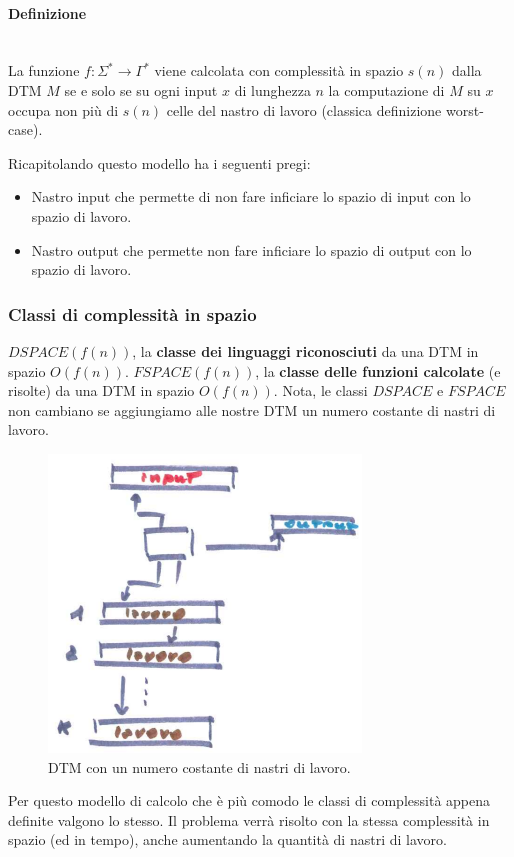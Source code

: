 \documentclass{article}
\begin{document}
\paragraph{Definizione}\mbox{}\\
La funzione $f:\Sigma^*\rightarrow\Gamma^*$ viene calcolata con complessità in spazio $s(n)$
dalla DTM $M$ se e solo se su ogni input $x$ di lunghezza $n$ la computazione di $M$ su $x$ occupa
non più di $s(n)$ celle del nastro di lavoro (classica definizione worst-case).

Ricapitolando questo modello ha i seguenti pregi:
\begin{itemize}
    \item Nastro input che permette di non fare inficiare lo spazio di input con lo spazio di lavoro.
    \item Nastro output che permette non fare inficiare lo spazio di output con lo spazio di lavoro.
\end{itemize}

\subsubsection{Classi di complessità in spazio}
$DSPACE(f(n))$, la \textbf{classe dei linguaggi riconosciuti} da una DTM in spazio $O(f(n))$.\newline\newline
$FSPACE(f(n))$, la \textbf{classe delle funzioni calcolate} (e risolte) da una DTM in spazio $O(f(n))$.\newline\newline
Nota, le classi $DSPACE$ e $FSPACE$ non cambiano se aggiungiamo alle nostre DTM un numero
costante di nastri di lavoro.
\begin{figure}[H]
    \centering
    \includegraphics[scale=0.6]{images/dtm_nastrilavoro.png}
    \caption{DTM con un numero costante di nastri di lavoro.}
\end{figure}
Per questo modello di calcolo che è più comodo le classi di complessità appena definite
valgono lo stesso. Il problema verrà risolto con la stessa complessità in spazio (ed
in tempo), anche aumentando la quantità di nastri di lavoro.
\end{document}
